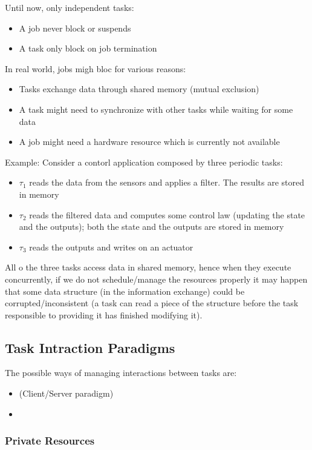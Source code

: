 Until now, only independent tasks:
\begin{itemize}
\item A job never block or suspends
\item A task only block on job termination
\end{itemize}
In real world, jobs migh bloc for various reasons:
\begin{itemize}
\item Tasks exchange data through shared memory (mutual exclusion)
\item A task might need to synchronize with other tasks while waiting for some data
\item A job might need a hardware resource which is currently not available
\end{itemize}

Example: Consider a contorl application composed by three periodic tasks:
\begin{itemize}
\item $\tau_1$ reads the data from the sensors and applies a filter. The results are stored in memory
\item $\tau_2$ reads the filtered data and computes some control law (updating the state and the outputs); both the state and the outputs are stored in memory
\item $\tau_3$ reads the outputs and writes on an actuator
\end{itemize}

All o the three tasks access data in shared memory, hence when they execute concurrently, if we do not schedule/manage the resources properly it may happen that some data structure (in the information exchange) could be corrupted/inconsistent (a task can read a piece of the structure before the task responsible to providing it has finished modifying it).

\subsection{Task Intraction Paradigms}

The possible ways of managing interactions between tasks are:
\begin{itemize}
\item {} (Client/Server paradigm)
\item {}
\end{itemize}

\subsubsection{Private Resources}

